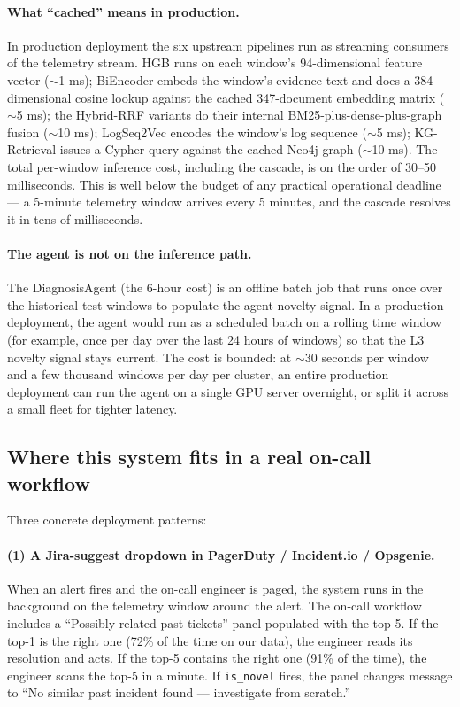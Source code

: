 \paragraph{What ``cached'' means in production.} In production deployment the six upstream pipelines run as streaming consumers of the telemetry stream. HGB runs on each window's 94-dimensional feature vector ($\sim$1 ms); BiEncoder embeds the window's evidence text and does a 384-dimensional cosine lookup against the cached 347-document embedding matrix ($\sim$5 ms); the Hybrid-RRF variants do their internal BM25-plus-dense-plus-graph fusion ($\sim$10 ms); LogSeq2Vec encodes the window's log sequence ($\sim$5 ms); KG-Retrieval issues a Cypher query against the cached Neo4j graph ($\sim$10 ms). The total per-window inference cost, including the cascade, is on the order of 30--50 milliseconds. This is well below the budget of any practical operational deadline --- a 5-minute telemetry window arrives every 5 minutes, and the cascade resolves it in tens of milliseconds.

\paragraph{The agent is not on the inference path.} The DiagnosisAgent (the 6-hour cost) is an offline batch job that runs once over the historical test windows to populate the agent novelty signal. In a production deployment, the agent would run as a scheduled batch on a rolling time window (for example, once per day over the last 24 hours of windows) so that the L3 novelty signal stays current. The cost is bounded: at $\sim$30 seconds per window and a few thousand windows per day per cluster, an entire production deployment can run the agent on a single GPU server overnight, or split it across a small fleet for tighter latency.

\subsection{Where this system fits in a real on-call workflow}

Three concrete deployment patterns:

\paragraph{(1) A Jira-suggest dropdown in PagerDuty / Incident.io / Opsgenie.}

When an alert fires and the on-call engineer is paged, the system runs in the background on the telemetry window around the alert. The on-call workflow includes a ``Possibly related past tickets'' panel populated with the top-5. If the top-1 is the right one (72\% of the time on our data), the engineer reads its resolution and acts. If the top-5 contains the right one (91\% of the time), the engineer scans the top-5 in a minute. If \texttt{is\_novel} fires, the panel changes message to ``No similar past incident found --- investigate from scratch.''

